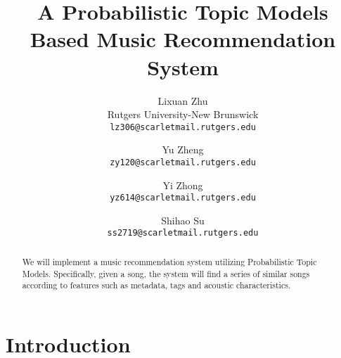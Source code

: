 \documentclass[10pt,twocolumn,letterpaper]{article}
\begin{document}
\title{A Probabilistic Topic Models Based Music Recommendation System
}

\author{Lixuan Zhu\\
Rutgers University-New Brunswick\\
{\tt\small lz306@scarletmail.rutgers.edu}
\and
Yu Zheng\\
{\tt\small zy120@scarletmail.rutgers.edu}
\and
Yi Zhong\\
{\tt\small yz614@scarletmail.rutgers.edu}
\and
Shihao Su\\
{\tt\small ss2719@scarletmail.rutgers.edu}\\
}

\maketitle

\begin{abstract}
   We will implement a music recommendation system utilizing Probabilistic Topic Models. Specifically, given a song, the system will find a series of similar songs according to features such as metadata, tags and acoustic characteristics.
\end{abstract}

\section{Introduction}
\end{document}
